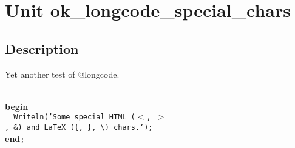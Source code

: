 \documentclass{report}
\begin{document}
\newlength{\tmplength}
\chapter{Unit ok{\_}longcode{\_}special{\_}chars}
\section{Description}
Yet another test of @longcode.\hfill\vspace*{1ex}



\texttt{\\\nopagebreak[3]
}\textbf{begin}\texttt{\\\nopagebreak[3]
~~Writeln('Some~special~HTML~({$<$},~{$>$},~{\&})~and~LaTeX~({\{},~{\}},~{\textbackslash})~chars.');\\\nopagebreak[3]
}\textbf{end}\texttt{;\\
}
\end{document}

